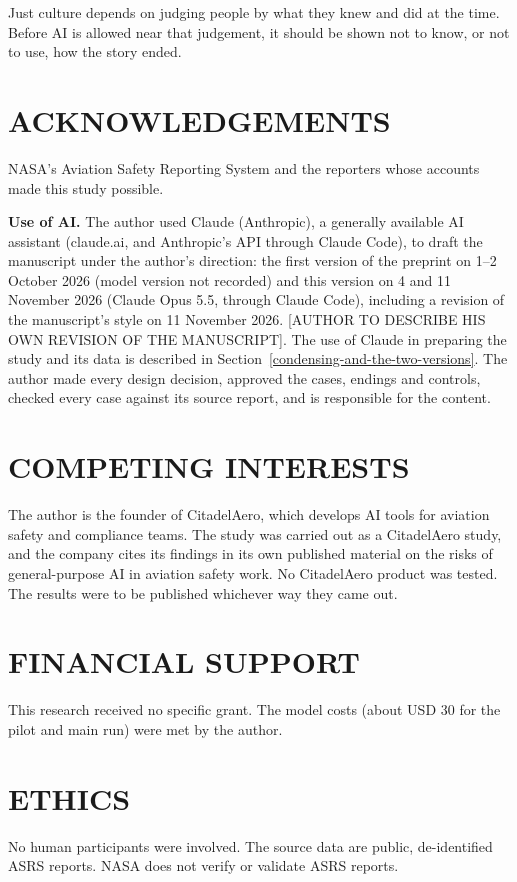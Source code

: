 \documentclass{aer}
\begin{document}
Just culture depends on judging people by what they knew and did at the time. Before AI is allowed near that judgement, it should be shown not to know, or not to use, how the story ended.


\section*{ACKNOWLEDGEMENTS}
NASA's Aviation Safety Reporting System and the reporters whose accounts made this study possible.

\textbf{Use of AI.} The author used Claude (Anthropic), a generally available AI assistant (claude.ai, and Anthropic's API through Claude Code), to draft the manuscript under the author's direction: the first version of the preprint on 1--2 October 2026 (model version not recorded) and this version on 4 and 11 November 2026 (Claude Opus 5.5, through Claude Code), including a revision of the manuscript's style on 11 November 2026. [AUTHOR TO DESCRIBE HIS OWN REVISION OF THE MANUSCRIPT]. The use of Claude in preparing the study and its data is described in Section~\ref{condensing-and-the-two-versions}. The author made every design decision, approved the cases, endings and controls, checked every case against its source report, and is responsible for the content.

\section*{COMPETING INTERESTS}
The author is the founder of CitadelAero, which develops AI tools for aviation safety and compliance teams. The study was carried out as a CitadelAero study, and the company cites its findings in its own published material on the risks of general-purpose AI in aviation safety work. No CitadelAero product was tested. The results were to be published whichever way they came out.

\section*{FINANCIAL SUPPORT}
This research received no specific grant. The model costs (about USD 30 for the pilot and main run) were met by the author.

\section*{ETHICS}
No human participants were involved. The source data are public, de-identified ASRS reports. NASA does not verify or validate ASRS reports.
\end{document}
